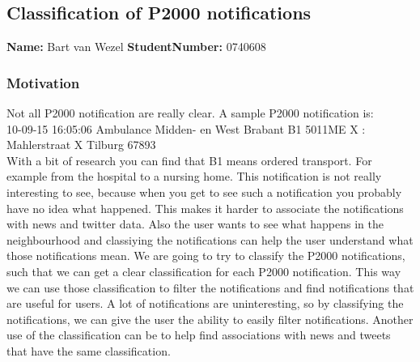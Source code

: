 \subsection{Classification of P2000 notifications }
\textbf{Name:} Bart van Wezel \indent \textbf{StudentNumber:} 0740608

\subsubsection*{Motivation}
Not all P2000 notification are really clear. A sample P2000 notification is: \\ 
10-09-15	16:05:06	Ambulance	Midden- en West Brabant	B1 5011ME X : Mahlerstraat X Tilburg 67893  \\
With a bit of research you can find that B1 means ordered transport. For example from the hospital to a nursing home. 
This notification is not really interesting to see, because when you get to see such a notification you probably have no idea what happened. 
This makes it harder to associate the notifications with news and twitter data. 
Also the user wants to see what happens in the neighbourhood and classiying the notifications can help the user understand what those notifications mean.
We are going to try to classify the P2000 notifications, such that we can get a clear classification for each P2000 notification.
This way we can use those classification to filter the notifications and find notifications that are useful for users. 
A lot of notifications are uninteresting, so by classifying the notifications, we can give the user the ability to easily filter notifications.
Another use of the classification can be to help find associations with news and tweets that have the same classification.

